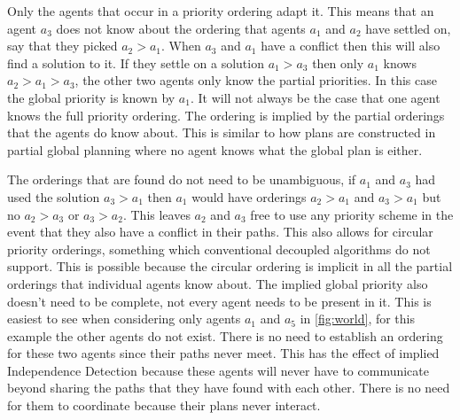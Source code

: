 Only the agents that occur in a priority ordering adapt it. This means that an
agent $a_3$ does not know about the ordering that agents $a_1$ and $a_2$ have
settled on, say that they picked $a_2 > a_1$. When $a_3$ and $a_1$ have a
conflict then this will also find a solution to it. If they settle on a
solution $a_1 > a_3$ then only $a_1$ knows $a_2 > a_1 > a_3$, the other two
agents only know the partial priorities. In this case the global priority is
known by $a_1$. It will not always be the case that one agent knows the
full priority ordering. The ordering is implied by the partial orderings that
the agents do know about. This is similar to how plans are constructed in
partial global planning where no agent knows what the global plan is either.

The orderings that are found do not need to be unambiguous, if $a_1$ and $a_3$
had used the solution $a_3 > a_1$ then $a_1$ would have orderings $a_2 > a_1$
and $a_3 > a_1$ but no $a_2 > a_3$ or $a_3 > a_2$. This leaves $a_2$ and $a_3$
free to use any priority scheme in the event that they also have a conflict in
their paths. This also allows for circular priority orderings, something which
conventional decoupled algorithms do not support. This is possible because the
circular ordering is implicit in all the partial orderings that individual
agents know about. The implied global priority also doesn't need to be
complete, not every agent needs to be present in it. This is easiest to see
when considering only agents $a_1$ and $a_5$ in \autoref{fig:world}, for this
example the other agents do not exist. There is no need to establish an
ordering for these two agents since their paths never meet. This has the effect
of implied Independence Detection \cite{standley2010} because these agents will
never have to communicate beyond sharing the paths that they have found with
each other. There is no need for them to coordinate because their plans never
interact.


